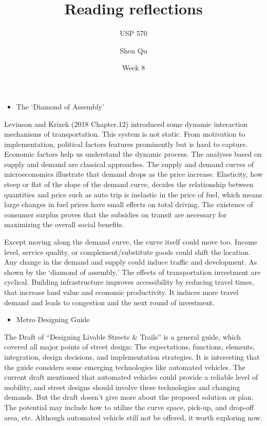 \documentclass[12pt,]{article}
\title{Reading reflections}
\subtitle{USP 570}
\author{Shen Qu}
\date{Week 8}
\providecommand{\tightlist}{%
  \setlength{\itemsep}{0pt}\setlength{\parskip}{0pt}}
\begin{document}
\maketitle

\begin{itemize}
\tightlist
\item
  The `Diamond of Assembly'
\end{itemize}

Levinson and Krizek (2018 Chapter.12) introduced some dynamic
interaction mechanisms of transportation. This system is not static.
From motivation to implementation, political factors features
prominently but is hard to capture. Economic factors help us understand
the dynamic process. The analyses based on supply and demand are
classical approaches. The supply and demand curves of microeconomics
illustrate that demand drops as the price increase. Elasticity, how
steep or flat of the slope of the demand curve, decides the relationship
between quantities and price such as auto trip is inelastic in the price
of fuel, which means large changes in fuel prices have small effects on
total driving. The existence of consumer surplus proves that the
subsidies on transit are necessary for maximizing the overall social
benefits.

Except moving along the demand curve, the curve itself could move too.
Income level, service quality, or complement/substitute goods could
shift the location. Any change in the demand and supply could induce
traffic and development. As shown by the `diamond of assembly,' The
effects of transportation investment are cyclical. Building
infrastructure improves accessibility by reducing travel times, that
increase land value and economic productivity. It induces more travel
demand and leads to congestion and the next round of investment.

\begin{itemize}
\tightlist
\item
  Metro Designing Guide
\end{itemize}

The Draft of ``Designing Livable Streets \& Trails'' is a general guide,
which covered all major points of street design: The expectations,
functions, elements, integration, design decisions, and implementation
strategies. It is interesting that the guide considers some emerging
technologies like automated vehicles. The current draft mentioned that
automated vehicles could provide a reliable level of mobility, and
street designs should involve these technologies and changing demands.
But the draft doesn't give more about the proposed solution or plan. The
potential may include how to utilize the curve space, pick-up, and
drop-off area, etc. Although automated vehicle still not be offered, it
worth exploring now.
\end{document}
